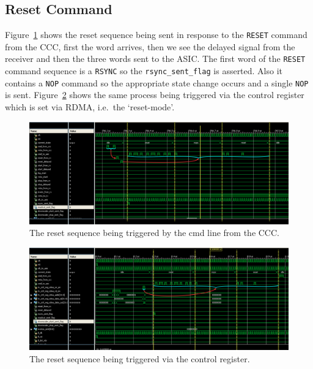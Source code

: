 \subsection{Reset Command} %
\label{sec:reset_command}
Figure~\ref{fig:isim_reset_cmd} shows the reset sequence being sent in response to the \texttt{RESET} command from the CCC, first the word arrives, then we see the delayed signal from the receiver and then the three words sent to the ASIC. The first word of the \texttt{RESET} command sequence is a \texttt{RSYNC} so the \texttt{rsync\_sent\_flag} is asserted. Also it contains a \texttt{NOP} command so the appropriate state change occurs and a single \texttt{NOP} is sent. Figure~\ref{fig:isim_reset_rdma} shows the same process being triggered via the control register which is set via RDMA, i.e.\ the `reset-mode'.
\begin{figure}
  \centering
  \includegraphics[width=\textwidth]{images/isim/edited/reset_cmd.png}
  \caption{The reset sequence being triggered by the cmd line from the CCC.}
  \label{fig:isim_reset_cmd}
\end{figure}
\begin{figure}
  \centering
  \includegraphics[width=\textwidth]{images/isim/edited/reset_rdma.png}
  \caption{The reset sequence being triggered via the control register.}
  \label{fig:isim_reset_rdma}
\end{figure}
\clearpage
